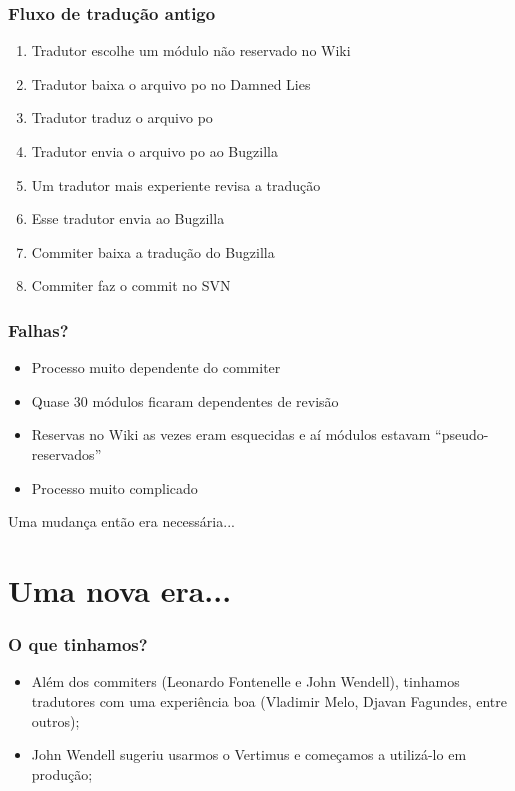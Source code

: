 \documentclass{beamer}
\begin{document}
\begin{frame}
    \frametitle{Fluxo de tradução antigo}
    \begin{enumerate}[<+->]
        \item Tradutor escolhe um módulo não reservado no Wiki
        \item Tradutor baixa o arquivo po no Damned Lies
        \item Tradutor traduz o arquivo po
        \item Tradutor envia o arquivo po ao Bugzilla
        \item Um tradutor mais experiente revisa a tradução 
        \item Esse tradutor envia ao Bugzilla
        \item Commiter baixa a tradução do Bugzilla
        \item Commiter faz o commit no SVN
    \end{enumerate}
\end{frame}

\begin{frame}
    \frametitle{Falhas?}
    \begin{itemize}[<+->]
        \item Processo muito dependente do commiter
        \item Quase 30 módulos ficaram dependentes de revisão
        \item Reservas no Wiki as vezes eram esquecidas e aí módulos estavam ``pseudo-reservados''
        \item Processo muito complicado
    \end{itemize}

    Uma mudança então era necessária...
\end{frame}

\section{Uma nova era...}

\begin{frame}
    \frametitle{O que tinhamos?}
    \begin{itemize}[<+->]
        \item Além dos commiters (Leonardo Fontenelle e John Wendell), tinhamos tradutores com uma experiência boa (Vladimir Melo, Djavan Fagundes, entre outros);
        \item John Wendell sugeriu usarmos o Vertimus e começamos a utilizá-lo em produção;
    \end{itemize}
\end{frame}
\end{document}
